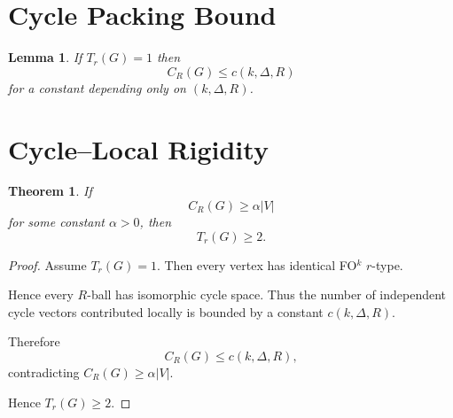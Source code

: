 \documentclass{article}
\newtheorem{theorem}{Theorem}
\newtheorem{lemma}{Lemma}
\begin{document}
\section*{Cycle Packing Bound}

\begin{lemma}
If $T_r(G)=1$ then
\[
C_R(G)\le c(k,\Delta,R)
\]
for a constant depending only on $(k,\Delta,R)$.
\end{lemma}

\section*{Cycle--Local Rigidity}

\begin{theorem}
If
\[
C_R(G) \ge \alpha |V|
\]
for some constant $\alpha>0$, then
\[
T_r(G) \ge 2.
\]
\end{theorem}

\begin{proof}
Assume $T_r(G)=1$.
Then every vertex has identical FO$^k$ $r$-type.

Hence every $R$-ball has isomorphic cycle space.
Thus the number of independent cycle vectors contributed locally is
bounded by a constant $c(k,\Delta,R)$.

Therefore
\[
C_R(G) \le c(k,\Delta,R),
\]
contradicting $C_R(G)\ge\alpha|V|$.

Hence $T_r(G)\ge2$.
\end{proof}
\end{document}

